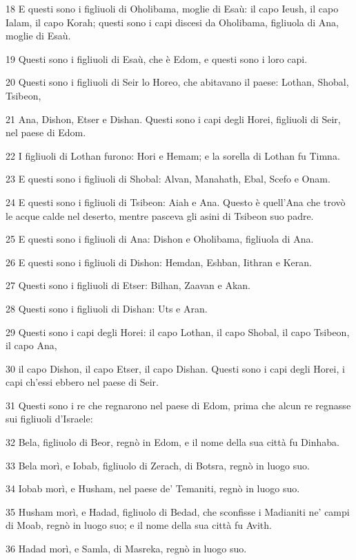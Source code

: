 \par 18 E questi sono i figliuoli di Oholibama, moglie di Esaù: il capo Ieush, il capo Ialam, il capo Korah; questi sono i capi discesi da Oholibama, figliuola di Ana, moglie di Esaù.
\par 19 Questi sono i figliuoli di Esaù, che è Edom, e questi sono i loro capi.
\par 20 Questi sono i figliuoli di Seir lo Horeo, che abitavano il paese: Lothan, Shobal, Tsibeon,
\par 21 Ana, Dishon, Etser e Dishan. Questi sono i capi degli Horei, figliuoli di Seir, nel paese di Edom.
\par 22 I figliuoli di Lothan furono: Hori e Hemam; e la sorella di Lothan fu Timna.
\par 23 E questi sono i figliuoli di Shobal: Alvan, Manahath, Ebal, Scefo e Onam.
\par 24 E questi sono i figliuoli di Tsibeon: Aiah e Ana. Questo è quell'Ana che trovò le acque calde nel deserto, mentre pasceva gli asini di Tsibeon suo padre.
\par 25 E questi sono i figliuoli di Ana: Dishon e Oholibama, figliuola di Ana.
\par 26 E questi sono i figliuoli di Dishon: Hemdan, Eshban, Iithran e Keran.
\par 27 Questi sono i figliuoli di Etser: Bilhan, Zaavan e Akan.
\par 28 Questi sono i figliuoli di Dishan: Uts e Aran.
\par 29 Questi sono i capi degli Horei: il capo Lothan, il capo Shobal, il capo Tsibeon, il capo Ana,
\par 30 il capo Dishon, il capo Etser, il capo Dishan. Questi sono i capi degli Horei, i capi ch'essi ebbero nel paese di Seir.
\par 31 Questi sono i re che regnarono nel paese di Edom, prima che alcun re regnasse sui figliuoli d'Israele:
\par 32 Bela, figliuolo di Beor, regnò in Edom, e il nome della sua città fu Dinhaba.
\par 33 Bela morì, e Iobab, figliuolo di Zerach, di Botsra, regnò in luogo suo.
\par 34 Iobab morì, e Husham, nel paese de' Temaniti, regnò in luogo suo.
\par 35 Husham morì, e Hadad, figliuolo di Bedad, che sconfisse i Madianiti ne' campi di Moab, regnò in luogo suo; e il nome della sua città fu Avith.
\par 36 Hadad morì, e Samla, di Masreka, regnò in luogo suo.
